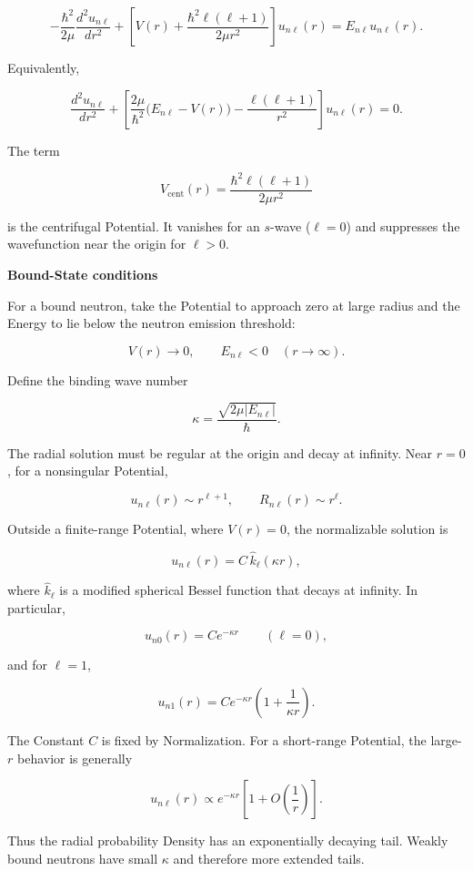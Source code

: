 \documentclass[a4paper, 10pt, onepage]{elegantbook}
\begin{document}
{\[
-\frac{\hbar^2}{2\mu}\frac{d^2u_{n\ell}}{dr^2}
+
\left[
V(r)+\frac{\hbar^2\ell(\ell+1)}{2\mu r^2}
\right]u_{n\ell}(r)
=E_{n\ell}u_{n\ell}(r).
\]

Equivalently,

\[
\frac{d^2u_{n\ell}}{dr^2}
+
\left[
\frac{2\mu}{\hbar^2}\bigl(E_{n\ell}-V(r)\bigr)
-\frac{\ell(\ell+1)}{r^2}
\right]u_{n\ell}(r)=0.
\]

The term

\[
V_{\mathrm{cent}}(r)
=\frac{\hbar^2\ell(\ell+1)}{2\mu r^2}
\]

is the centrifugal Potential. 
It vanishes for an \(s\)-wave (\(\ell=0\)) and suppresses the wavefunction near the origin for \(\ell>0\).

  \textbf{Bound-State conditions}

For a bound neutron,
 take the Potential to approach zero at large radius and the Energy to lie below the neutron emission threshold:

\[
V(r)\longrightarrow 0,\qquad E_{n\ell}<0
\quad (r\longrightarrow\infty).
\]

Define the binding wave number

\[
\kappa=\frac{\sqrt{2\mu |E_{n\ell}|}}{\hbar}.
\]

The radial solution must be regular at the origin and decay at infinity. Near \(r=0\), for a nonsingular Potential,

\[
u_{n\ell}(r)\sim r^{\ell+1},
\qquad
R_{n\ell}(r)\sim r^\ell.
\]

Outside a finite-range Potential, where \(V(r)=0\), the normalizable solution is

\[
u_{n\ell}(r)=C\,\hat{k}_{\ell}(\kappa r),
\]

where \(\hat{k}_{\ell}\) is a modified spherical Bessel function that decays at infinity. In particular,

\[
u_{n0}(r)=C e^{-\kappa r}
\qquad (\ell=0),
\]

and for \(\ell=1\),

\[
u_{n1}(r)=C e^{-\kappa r}
\left(1+\frac{1}{\kappa r}\right).
\]

The Constant \(C\) is fixed by Normalization. For a short-range Potential, the large-\(r\) behavior is generally

\[
u_{n\ell}(r)\propto e^{-\kappa r}
\left[1+O\!\left(\frac{1}{r}\right)\right].
\]

Thus the radial probability Density has an exponentially decaying tail. 
Weakly bound neutrons have small \(\kappa\) and therefore more extended tails.

}
\end{document}
